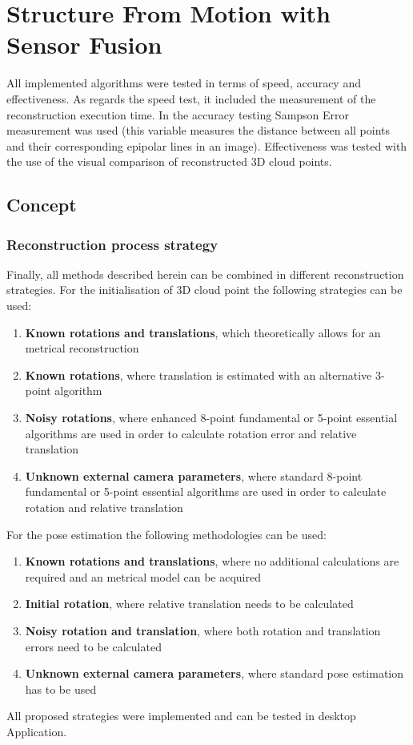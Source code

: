 
\ifpdf
    \graphicspath{{figures/}{figures/comparisons}}
\else
    \graphicspath{{figures/}{figures/comparisons}}
\fi

\chapter{Structure From Motion with Sensor Fusion} \label{chap:structure_from_motion}
All implemented algorithms were tested in terms of speed, accuracy and effectiveness. As regards the speed test, it included the measurement of the reconstruction execution time. In the accuracy testing Sampson Error measurement was used (this variable measures the distance between all points and their corresponding epipolar lines in an image). Effectiveness was tested with the use of the visual comparison of reconstructed 3D cloud points.
\section{Concept}
\subsection{Reconstruction process strategy}
Finally, all methods described herein can be combined in different reconstruction strategies. For the initialisation of 3D cloud point the following strategies can be used:
\begin{enumerate} 
\item \textbf{Known rotations and translations}, which theoretically allows for an metrical reconstruction
\item \textbf{Known rotations}, where translation is estimated with an alternative 3-point algorithm
\item \textbf{Noisy rotations}, where enhanced 8-point fundamental or 5-point essential algorithms are used in order to calculate rotation error and relative translation 
\item \textbf{Unknown external camera parameters}, where standard 8-point fundamental or 5-point essential algorithms are used in order to calculate rotation and relative translation
\end{enumerate}
For the pose estimation the following methodologies can be used:
\begin{enumerate}
\item \textbf{Known rotations and translations}, where no additional calculations are required and an metrical model can be acquired
\item \textbf{Initial rotation}, where relative translation needs to be calculated
\item \textbf{Noisy rotation and translation}, where both rotation and translation errors need to be calculated
\item \textbf{Unknown external camera parameters}, where standard pose estimation has to be used
\end{enumerate}
All proposed strategies were implemented and can be tested in desktop Application.

